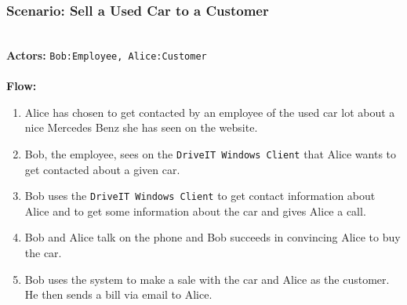 \subsubsection{Scenario: Sell a Used Car to a Customer}
\label{sec:scenario-sellcar}
\HRule \\[0.4cm]
\textbf{Actors:} \texttt{Bob:Employee, Alice:Customer}\\
\HRule \\[0.4cm]
\textbf{Flow:} \\
\begin{enumerate}
\item Alice has chosen to get contacted by an employee of the used car lot about a nice Mercedes Benz she has seen on the website.
\item Bob, the employee, sees on the \texttt{DriveIT Windows Client} that Alice wants to get contacted about a given car.
\item Bob uses the \texttt{DriveIT Windows Client} to get contact information about Alice and to get some information about the car and gives Alice a call.
\item Bob and Alice talk on the phone and Bob succeeds in convincing Alice to buy the car.
\item Bob uses the system to make a sale with the car and Alice as the customer. He then sends a bill via email to Alice.
\end{enumerate}
\HRule \\[0.4cm]
